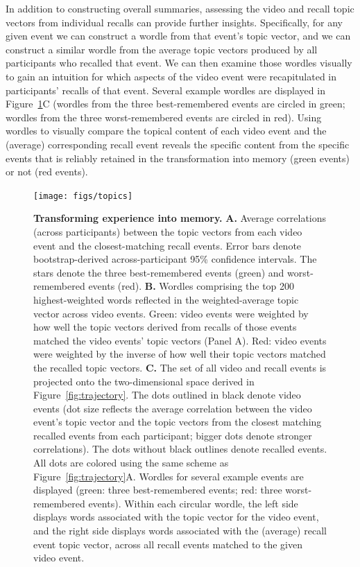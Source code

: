 \documentclass{article}
\begin{document}
In addition to constructing overall summaries, assessing the video and recall topic vectors from individual recalls can provide further insights.  Specifically, for any given event we can construct a wordle from that event's topic vector, and we can construct a similar wordle from the average topic vectors produced by all participants who recalled that event.  We can then examine those wordles visually to gain an intuition for which aspects of the video event were recapitulated in participants' recalls of that event.  Several example wordles are displayed in Figure~\ref{fig:topics}C (wordles from the three best-remembered events are circled in green; wordles from the three worst-remembered events are circled in red).  Using wordles to visually compare the topical content of each video event and the (average) corresponding recall event reveals the specific content from the specific events that is reliably retained in the transformation into memory (green events) or not (red events).

\begin{figure}[tp]
\centering
\texttt{[image: figs/topics]}
\caption{\small \textbf{Transforming experience into memory.} \textbf{A.} Average correlations (across participants) between the topic vectors from each video event and the closest-matching recall events.  Error bars denote bootstrap-derived across-participant 95\% confidence intervals.  The stars denote the three best-remembered events (green) and worst-remembered events (red).  \textbf{B.} Wordles comprising the top 200 highest-weighted words reflected in the weighted-average topic vector across video events.  Green: video events were weighted by how well the topic vectors derived from recalls of those events matched the video events' topic vectors (Panel A).  Red: video events were weighted by the inverse of how well their topic vectors matched the recalled topic vectors.  \textbf{C.}  The set of all video and recall events is projected onto the two-dimensional space derived in Figure~\ref{fig:trajectory}.  The dots outlined in black denote video events (dot size reflects the average correlation between the video event's topic vector and the topic vectors from the closest matching recalled events from each participant; bigger dots denote stronger correlations).  The dots without black outlines denote recalled events.  All dots are colored using the same scheme as Figure~\ref{fig:trajectory}A.  Wordles for several example events are displayed (green: three best-remembered events; red: three worst-remembered events).  Within each circular wordle, the left side displays words associated with the topic vector for the video event, and the right side displays words associated with the (average) recall event topic vector, across all recall events matched to the given video event.}
\label{fig:topics}
\end{figure}
\end{document}
